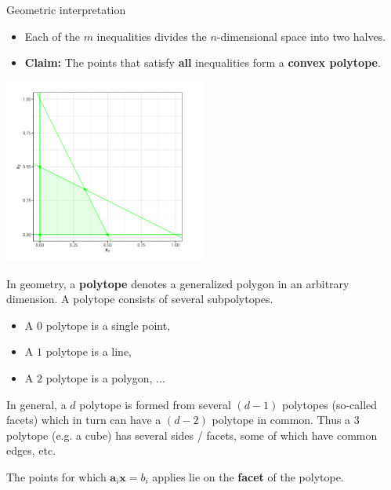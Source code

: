 \begin{vbframe}{Geometric interpretation}
\begin{itemize}



\framebreak

\item Each of the $m$ inequalities divides the $n$-dimensional space into two halves.
\item \textbf{Claim:} The points that satisfy \textbf{all} inequalities form a \textbf{convex polytope}.
\end{itemize}

\begin{center}
\includegraphics[width = 0.5\textwidth]{figure_man/linear-pro-example.png}
\end{center}




\framebreak

In geometry, a \textbf{polytope} denotes a generalized polygon in an arbitrary dimension. A polytope consists of several subpolytopes.

\begin{itemize}
\item A $0$ polytope is a single point,
\item A $1$ polytope is a line,
\item A $2$ polytope is a polygon, ...
\end{itemize}

In general, a $d$ polytope is formed from several $(d-1)$ polytopes (so-called facets) which in turn can have a $(d-2)$ polytope in common. Thus a $3$ polytope (e.g. a cube) has several sides / facets, some of which have common edges, etc.

\framebreak

The points for which $\bm{a}_i \bm{x} = b_i$ applies lie on the \textbf{facet} of the polytope.



\end{vbframe}
